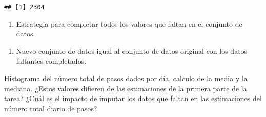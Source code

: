 \documentclass[
]{article}
\newenvironment{Shaded}{\begin{snugshade}}{\end{snugshade}}
\newcommand{\ControlFlowTok}[1]{\textcolor[rgb]{0.13,0.29,0.53}{\textbf{#1}}}
\newcommand{\DecValTok}[1]{\textcolor[rgb]{0.00,0.00,0.81}{#1}}
\newcommand{\FunctionTok}[1]{\textcolor[rgb]{0.00,0.00,0.00}{#1}}
\newcommand{\NormalTok}[1]{#1}
\newcommand{\OtherTok}[1]{\textcolor[rgb]{0.56,0.35,0.01}{#1}}
\newcommand{\SpecialCharTok}[1]{\textcolor[rgb]{0.00,0.00,0.00}{#1}}
\providecommand{\tightlist}{%
  \setlength{\itemsep}{0pt}\setlength{\parskip}{0pt}}
\begin{document}
\begin{verbatim}
## [1] 2304
\end{verbatim}

\begin{enumerate}
\def\labelenumi{\arabic{enumi}.}
\setcounter{enumi}{1}
\tightlist
\item
  Estrategia para completar todos los valores que faltan en el conjunto
  de datos.
\end{enumerate}

\begin{Shaded}
\end{Shaded}

\begin{enumerate}
\def\labelenumi{\arabic{enumi}.}
\setcounter{enumi}{2}
\tightlist
\item
  Nuevo conjunto de datos igual al conjunto de datos original con los
  datos faltantes completados.
\end{enumerate}

\begin{Shaded}
\end{Shaded}

Histograma del número total de pasos dados por día, calculo de la media
y la mediana. ¿Estos valores difieren de las estimaciones de la primera
parte de la tarea? ¿Cuál es el impacto de imputar los datos que faltan
en las estimaciones del número total diario de pasos?
\end{document}
